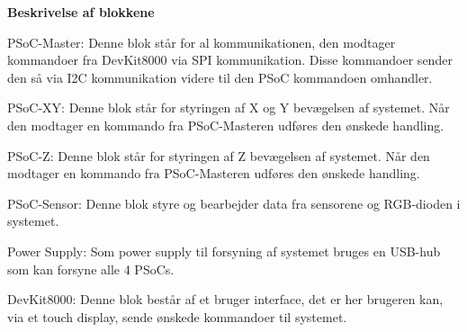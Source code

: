 \textbf{Beskrivelse af blokkene}

PSoC-Master: Denne blok står for al kommunikationen, den modtager kommandoer fra DevKit8000 via SPI kommunikation. Disse kommandoer sender den så via I2C kommunikation videre til den PSoC kommandoen omhandler.

PSoC-XY: Denne blok står for styringen af X og Y bevægelsen af systemet. Når den modtager en kommando fra PSoC-Masteren udføres den ønskede handling. 

PSoC-Z: Denne blok står for styringen af Z bevægelsen af systemet. Når den modtager en kommando fra PSoC-Masteren udføres den ønskede handling.

PSoC-Sensor: Denne blok styre og bearbejder data fra sensorene og RGB-dioden i systemet.

Power Supply: Som power supply til forsyning af systemet bruges en USB-hub som kan forsyne alle 4 PSoCs.

DevKit8000: Denne blok består af et bruger interface, det er her brugeren kan, via et touch display, sende ønskede kommandoer til systemet. 

